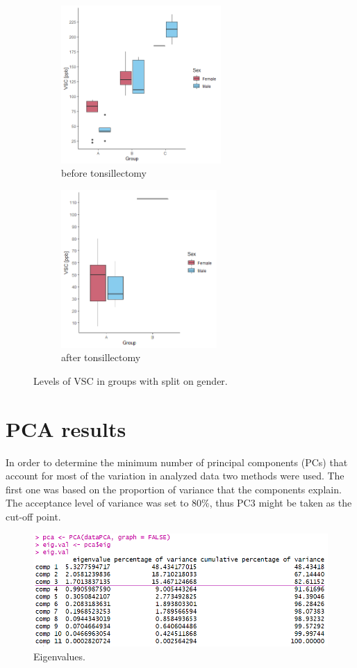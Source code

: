 \documentclass[12pt,a4paper,notitlepage]{report}
\begin{document}
\begin{figure}[h]
 
\begin{subfigure}{0.5\textwidth}
\includegraphics[width=1\linewidth, height=6cm]{./Figures/Fig_3.1a} 
\caption{before tonsillectomy}
\label{Fig_3.1a}
\end{subfigure}
\begin{subfigure}{0.5\textwidth}
\includegraphics[width=1\linewidth, height=6cm]{./Figures/Fig_3.1b}
\caption{after tonsillectomy}
\label{Fig_3.1b}
\end{subfigure}
 
\caption{Levels of VSC in groups with split on gender.}
\label{Fig_3.1}
\end{figure}


\section{PCA results}


In order to determine the minimum number of principal components (PCs) that account for most of the variation in analyzed data two methods were used. The first one was based on the proportion of variance that the components explain. The acceptance level of variance was set to 80\%, thus PC3 might be taken as the cut-off point.

\begin{figure}[h]
	\includegraphics[scale=0.80]{./Figures/Fig_3.2}
	\caption{Eigenvalues.}
	\label{Fig_3.2}
\end{figure}	
\end{document}
